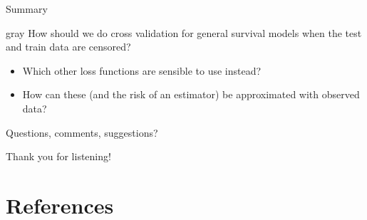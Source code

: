 \documentclass[smaller]{beamer}\usepackage{listings}
\begin{document}
\begin{frame}[label={sec:org707419d}]{Summary}
\begin{beamercolorbox}[rounded=true]{gray}
\centering How should we do cross validation for general survival models when the
test and train data are censored?
\end{beamercolorbox}


\vfill

\begin{itemize}
\item Which other loss functions are sensible to use instead?
\item How can these (and the risk of an estimator) be approximated with observed data?

\vfill
\end{itemize}


\begin{block}{Questions, comments, suggestions?}
\vfill 

\flushright Thank you for listening!
\end{block}
\end{frame}

\section{References}
\label{sec:org1a91b15}
\tiny 
\end{document}
